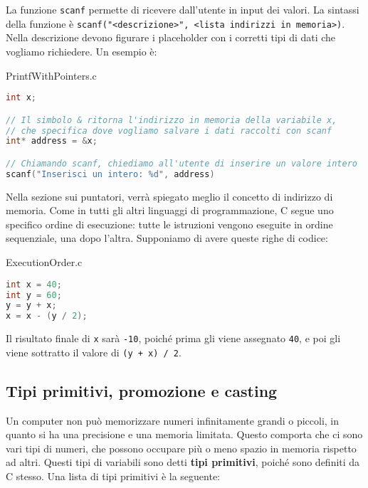 La funzione \verb|scanf| permette di ricevere dall'utente in input dei valori. La sintassi della funzione è \verb|scanf("<descrizione>", <lista indirizzi in memoria>)|. Nella descrizione devono figurare i placeholder con i corretti tipi di dati che vogliamo richiedere. Un esempio è:

\begin{codeblock}{PrintfWithPointers.c}
    \begin{lstlisting}[language = c]
int x;

// Il simbolo & ritorna l'indirizzo in memoria della variabile x,
// che specifica dove vogliamo salvare i dati raccolti con scanf
int* address = &x;

// Chiamando scanf, chiediamo all'utente di inserire un valore intero
scanf("Inserisci un intero: %d", address)
    \end{lstlisting}
\end{codeblock}

Nella sezione sui puntatori, verrà spiegato meglio il concetto di indirizzo di memoria.
\nwl
Come in tutti gli altri linguaggi di programmazione, C segue uno specifico ordine di esecuzione: tutte le istruzioni vengono eseguite in ordine sequenziale, una dopo l'altra. Supponiamo di avere queste righe di codice:

\begin{codeblock}{ExecutionOrder.c}
    \begin{lstlisting}[language = c]
int x = 40;
int y = 60;
y = y + x;
x = x - (y / 2);
    \end{lstlisting}
\end{codeblock}

Il risultato finale di \verb|x| sarà \verb|-10|, poiché prima gli viene assegnato \verb|40|, e poi gli viene sottratto il valore di \verb|(y + x) / 2|.

\subsection{Tipi primitivi, promozione e casting}

Un computer non può memorizzare numeri infinitamente grandi o piccoli, in quanto si ha una precisione e una memoria limitata. Questo comporta che ci sono vari tipi di numeri, che possono occupare più o meno spazio in memoria rispetto ad altri. Questi tipi di variabili sono detti \textbf{tipi primitivi}, poiché sono definiti da C stesso. Una lista di tipi primitivi è la seguente:

